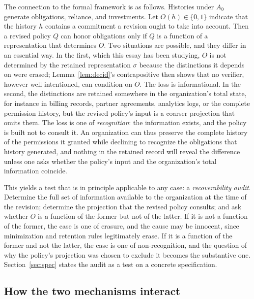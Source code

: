 \documentclass[11pt]{article}
\theoremstyle{definition}
\theoremstyle{remark}
\newcommand{\Bool}{\{0,1\}}
\begin{document}
The connection to the formal framework is as follows. Histories under $A_0$ generate obligations, reliance, and investments. Let $O(h)\in\Bool$ indicate that the history $h$ contains a commitment a revision ought to take into account. Then a revised policy $Q$ can honor obligations only if $Q$ is a function of a representation that determines $O$. Two situations are possible, and they differ in an essential way. In the first, which this essay has been studying, $O$ is not determined by the retained representation $\sigma$ because the distinctions it depends on were erased; Lemma~\ref{lem:decid}'s contrapositive then shows that no verifier, however well intentioned, can condition on $O$. The loss is informational. In the second, the distinctions are retained somewhere in the organization's total state, for instance in billing records, partner agreements, analytics logs, or the complete permission history, but the revised policy's input is a coarser projection that omits them. The loss is one of \emph{recognition}: the information exists, and the policy is built not to consult it. An organization can thus preserve the complete history of the permissions it granted while declining to recognize the obligations that history generated, and nothing in the retained record will reveal the difference unless one asks whether the policy's input and the organization's total information coincide.

This yields a test that is in principle applicable to any case: a \emph{recoverability audit}. Determine the full set of information available to the organization at the time of the revision; determine the projection that the revised policy consults; and ask whether $O$ is a function of the former but not of the latter. If it is not a function of the former, the case is one of erasure, and the cause may be innocent, since minimization and retention rules legitimately erase. If it is a function of the former and not the latter, the case is one of non-recognition, and the question of why the policy's projection was chosen to exclude it becomes the substantive one. Section~\ref{sec:spec} states the audit as a test on a concrete specification.

\subsection{How the two mechanisms interact}
\end{document}
